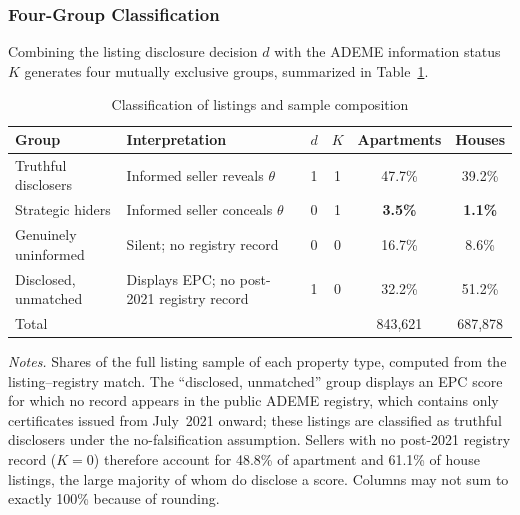 \subsubsection{Four-Group Classification}

Combining the listing disclosure decision $d$ with the ADEME information status $K$ generates four mutually exclusive groups, summarized in Table~\ref{tab:groups}.

\begin{table}[htbp]
\centering
\caption{Classification of listings and sample composition}
\label{tab:groups}
\small\renewcommand{\arraystretch}{1.3}
\begin{tabular}{llcccc}
\toprule\toprule
\textbf{Group} & \textbf{Interpretation} & $d$ & $K$ & \textbf{Apartments} & \textbf{Houses} \\
\midrule
Truthful disclosers  & Informed seller reveals $\theta$        & 1 & 1 & 47.7\% & 39.2\% \\
Strategic hiders     & Informed seller conceals $\theta$     & 0 & 1 & \textbf{3.5\%}  & \textbf{1.1\%}  \\
Genuinely uninformed & Silent; no registry record              & 0 & 0 & 16.7\% & 8.6\% \\
Disclosed, unmatched & Displays EPC; no post-2021 registry record & 1 & 0 & 32.2\% & 51.2\% \\
\midrule
Total                &                                         &   &   & 843,621 & 687,878 \\
\bottomrule\bottomrule
\end{tabular}
\vspace{0.5em}
\begin{minipage}{\linewidth}
\footnotesize\textit{Notes.} Shares of the full listing sample of each property type, computed from the
listing--registry match. The ``disclosed, unmatched'' group displays an EPC score for which no record
appears in the public ADEME registry, which contains only certificates issued from July~2021 onward;
these listings are classified as truthful disclosers under the no-falsification assumption. Sellers
with no post-2021 registry record ($K=0$) therefore account for 48.8\% of apartment and 61.1\% of
house listings, the large majority of whom do disclose a score. Columns may not sum to exactly 100\%
because of rounding.
\end{minipage}
\end{table}

